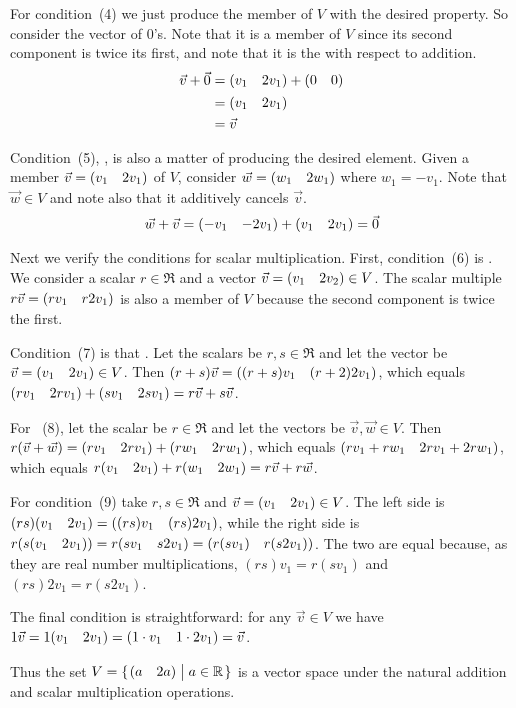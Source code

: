 \documentclass[10pt,t]{beamer}
\begin{document}
\begin{frame}
\pause
For condition~(4) we just produce the member of $V$ with the desired 
property. 
So consider the vector of $0$'s.
Note that it is a member of $V$ since its second component is twice its first,
and note that it is the 
with respect to addition. 
\begin{align*}
  \vec{v}+\vec{0}
  &=(\begin{matrix} v_1 &2v_1 \end{matrix})+(\begin{matrix} 0  &0 \end{matrix})     \\
  &=(\begin{matrix} v_1 &2v_1 \end{matrix})    \\
  &=\vec{v}
\end{align*}
\end{frame}\begin{frame}
Condition~(5), , is also a matter of 
producing the desired element.
Given a member $\vec{v}=(\begin{matrix} v_1 &2v_1 \end{matrix})$ of $V$, consider
$\vec{w}=(\begin{matrix} w_1 &2w_1 \end{matrix})$ where $w_1=-v_1$.
Note that $\vec{w}\in V$ and note also that it 
additively cancels $\vec{v}$.
\begin{equation*}
  \vec{w}+\vec{v}=(\begin{matrix} -v_1 &-2v_1 \end{matrix})+(\begin{matrix} v_1 &2v_1 \end{matrix})=\vec{0}
\end{equation*}

\pause
Next we verify the conditions for scalar multiplication.
First, condition~(6) is .
We consider a scalar $r\in\Re$ and a vector $\vec{v}=(\begin{matrix} v_1 &2v_2 \end{matrix})\in V$.
The scalar multiple $r\vec{v}=(\begin{matrix} rv_1 &r2v_1 \end{matrix})$ is also a member
of $V$ because the second component is twice the first.

\pause
Condition~(7) is that 
.
Let the scalars be $r,s\in\Re$ and 
let the vector be $\vec{v}=(\begin{matrix} v_1 &2v_1 \end{matrix})\in V$.
Then $(r+s)\vec{v}=(\begin{matrix} (r+s)v_1 &(r+2)2v_1 \end{matrix})$,
which equals $(\begin{matrix} rv_1 &2rv_1 \end{matrix})+(\begin{matrix} sv_1 &2sv_1 \end{matrix})=r\vec{v}+s\vec{v}$.
\end{frame}\begin{frame}
For 
~(8),
let the scalar be $r\in\Re$ and 
let the vectors be $\vec{v},\vec{w}\in V$.
Then $r(\vec{v}+\vec{w})=(\begin{matrix} rv_1 &2rv_1 \end{matrix})+(\begin{matrix} rw_1 &2rw_1 \end{matrix})$,
which equals $(\begin{matrix} rv_1+rw_1 &2rv_1+2rw_1 \end{matrix})$,
which equals 
$r(\begin{matrix} v_1 &2v_1 \end{matrix})+r(\begin{matrix} w_1 &2w_1 \end{matrix})=r\vec{v}+r\vec{w}$.

\pause
For condition~(9) take $r,s\in\Re$ and $\vec{v}=(\begin{matrix} v_1 &2v_1 \end{matrix})\in V$.
The left side is $(rs)(\begin{matrix} v_1 &2v_1 \end{matrix})=(\begin{matrix} (rs)v_1 &(rs)2v_1 \end{matrix})$, while the
right side is 
$r(s(\begin{matrix} v_1 &2v_1 \end{matrix}))=r(\begin{matrix} sv_1 &s2v_1 \end{matrix})=(\begin{matrix} r(sv_1) &r(s2v_1) \end{matrix})$.
The two are equal because, as they are real number multiplications,
$(rs)v_1=r(sv_1)$ and $(rs)2v_1=r(s2v_1)$.   

\pause
The final condition is straightforward:
for any $\vec{v}\in V$ we have
$1\vec{v}=1(\begin{matrix} v_1 &2v_1 \end{matrix})=(\begin{matrix} 1\cdot v_1 &1\cdot 2v_1 \end{matrix})=\vec{v}$.

\pause\medskip
Thus the set
$V=\mbox{$\{\hspace{0.1em}(\begin{matrix} a  &2a \end{matrix})\bigm| a\in\mathbb{R}\hspace{0.1em}\}$}$
is a vector space under the natural addition and scalar multiplication 
operations.
\end{frame}
\end{document}
